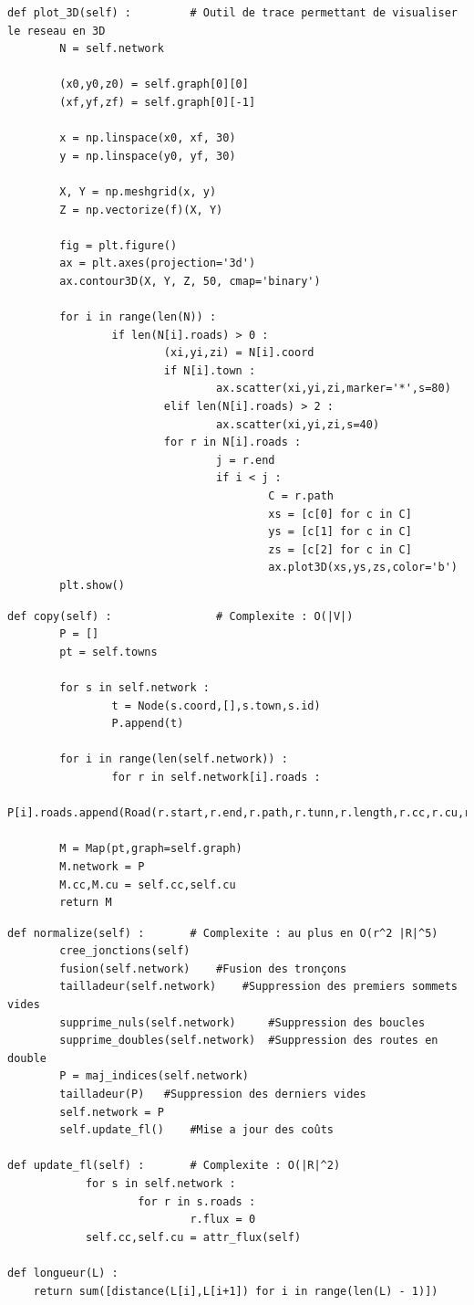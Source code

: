 \documentclass{beamer}[11pt]
\begin{document}
		\begin{frame}[containsverbatim]
\begin{lstlisting}[basicstyle=\tiny]
def plot_3D(self) :			# Outil de trace permettant de visualiser le reseau en 3D
		N = self.network

		(x0,y0,z0) = self.graph[0][0]
		(xf,yf,zf) = self.graph[0][-1]

		x = np.linspace(x0, xf, 30)
		y = np.linspace(y0, yf, 30)

		X, Y = np.meshgrid(x, y)
		Z = np.vectorize(f)(X, Y)

		fig = plt.figure()
		ax = plt.axes(projection='3d')
		ax.contour3D(X, Y, Z, 50, cmap='binary')

		for i in range(len(N)) :
				if len(N[i].roads) > 0 :
						(xi,yi,zi) = N[i].coord
						if N[i].town :
								ax.scatter(xi,yi,zi,marker='*',s=80)
						elif len(N[i].roads) > 2 :
								ax.scatter(xi,yi,zi,s=40)
						for r in N[i].roads :
								j = r.end
								if i < j :
										C = r.path
										xs = [c[0] for c in C]
										ys = [c[1] for c in C]
										zs = [c[2] for c in C]
										ax.plot3D(xs,ys,zs,color='b')
		plt.show()
\end{lstlisting}
		\end{frame}

		\begin{frame}[containsverbatim]
\begin{lstlisting}
def copy(self) :				# Complexite : O(|V|)
		P = []
		pt = self.towns

		for s in self.network :
				t = Node(s.coord,[],s.town,s.id)
				P.append(t)

		for i in range(len(self.network)) :
				for r in self.network[i].roads :
						P[i].roads.append(Road(r.start,r.end,r.path,r.tunn,r.length,r.cc,r.cu,r.flux))

		M = Map(pt,graph=self.graph)
		M.network = P
		M.cc,M.cu = self.cc,self.cu
		return M
\end{lstlisting}
		\end{frame}

		\begin{frame}[containsverbatim]
\begin{lstlisting}
def normalize(self) :		# Complexite : au plus en O(r^2 |R|^5)
		cree_jonctions(self)
		fusion(self.network)    #Fusion des tronçons
		tailladeur(self.network)    #Suppression des premiers sommets vides
		supprime_nuls(self.network)     #Suppression des boucles
		supprime_doubles(self.network)  #Suppression des routes en double
		P = maj_indices(self.network)
		tailladeur(P)   #Suppression des derniers vides
		self.network = P
		self.update_fl()    #Mise a jour des coûts

def update_fl(self) :		# Complexite : O(|R|^2)
			for s in self.network :
					for r in s.roads :
							r.flux = 0
			self.cc,self.cu = attr_flux(self)

def longueur(L) :
    return sum([distance(L[i],L[i+1]) for i in range(len(L) - 1)])
\end{lstlisting}
		\end{frame}
\end{document}
